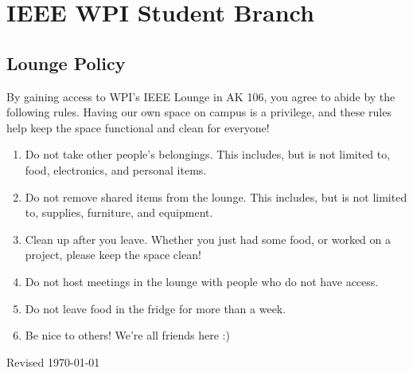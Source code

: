 \documentclass{report}
\begin{document}
\section*{IEEE WPI Student Branch}
\subsection*{Lounge Policy}
By gaining access to WPI's IEEE Lounge in AK 106, you agree to abide by the following rules. Having our own space on campus is a privilege, and these rules help keep the space functional and clean for everyone!

\begin{enumerate}
    \item{Do not take other people's belongings. This includes, but is not limited to, food, electronics, and personal items.}
    \item{Do not remove shared items from the lounge. This includes, but is not limited to, supplies, furniture, and equipment.}
    \item{Clean up after you leave. Whether you just had some food, or worked on a project, please keep the space clean!}
    \item{Do not host meetings in the lounge with people who do not have access.}
    \item{Do not leave food in the fridge for more than a week.}
    \item{Be nice to others! We're all friends here :)}
\end{enumerate}

\vspace{\fill}
\normalsize{Revised \today}
\end{document}
